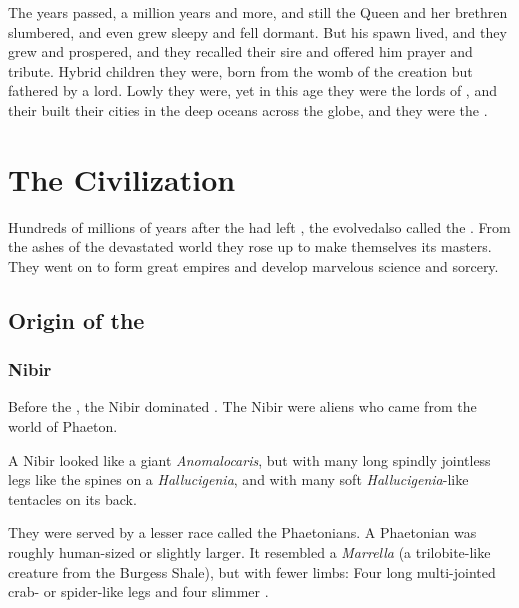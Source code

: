 The years passed, a million years and more, and still the \Kraken{} Queen and her brethren slumbered, and even \Moroch{} grew sleepy and fell dormant. But his spawn lived, and they grew and prospered, and they recalled their sire and offered him prayer and tribute. Hybrid children they were, born from the womb of the \psp{\voyagers} creation but fathered by a \kraken{} lord. Lowly they were, yet in this age they were the lords of \Miith{}, and their built their cities in the deep oceans across the globe, and they were the \nagae{}. 















\section{The \Ophidian{} Civilization}
Hundreds of millions of years after the \voyagers{} had left \Miith{}, the \ophidians{} evolved\dash also called the \caisith. 
From the ashes of the devastated world they rose up to make themselves its masters.
They went on to form great empires and develop marvelous science and sorcery.









\subsection{Origin of the \ophidians}





\subsubsection{Nibir}
%
%
Before the \ophidians, the Nibir dominated \Miith. 
The Nibir were aliens who came from the world of Phaeton. 

A Nibir looked like a giant \emph{Anomalocaris}, but with many long spindly jointless legs like the spines on a \emph{Hallucigenia}, and with many soft \emph{Hallucigenia}-like tentacles on its back. 

They were served by a lesser race called the Phaetonians. 
A Phaetonian was roughly human-sized or slightly larger. 
It resembled a \emph{Marrella} (a trilobite-like creature from the Burgess Shale), but with fewer limbs: 
Four long multi-jointed crab- or spider-like legs and four slimmer . 






